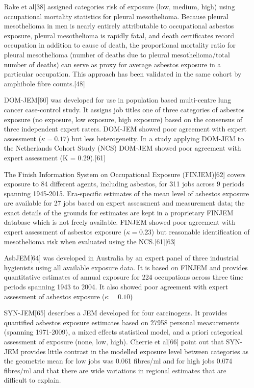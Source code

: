 \documentclass[12pt,a4paper,]{report}
\begin{document}
Rake et al{[}38{]} assigned categories risk of exposure (low, medium,
high) using occupational mortality statistics for pleural mesothelioma.
Because pleural mesothelioma in men is nearly entirely attributable to
occupational asbestos exposure, pleural mesothelioma is rapidly fatal,
and death certificates record occupation in addition to cause of death,
the proportional mortality ratio for pleural mesothelioma (number of
deaths due to pleural mesothelioma/total number of deaths) can serve as
proxy for average asbestos exposure in a particular occupation. This
approach has been validated in the same cohort by amphibole fibre
counts.{[}48{]}

DOM-JEM{[}60{]} was developed for use in population based multi-centre
lung cancer case-control study. It assigns job titles one of three
categories of asbestos exposure (no exposure, low exposure, high
exposure) based on the consensus of three independent expert raters.
DOM-JEM showed poor agreement with expert assessment
(\ensuremath{\kappa = 0.17}) but less heterogeneity. In a study applying
DOM-JEM to the Netherlands Cohort Study (NCS) DOM-JEM showed poor
agreement with expert assessment (K = 0.29).{[}61{]}

The Finish Information System on Occupational Exposure (FINJEM){[}62{]}
covers exposure to 84 different agents, including asbestos, for 311 jobs
across 9 periods spanning 1945-2015. Era-specific estimates of the mean
level of asbestos exposure are available for 27 jobs based on expert
assessment and measurement data; the exact details of the grounds for
estimates are kept in a proprietary FINJEM database which is not freely
available. FINJEM showed poor agreement with expert assessment of
asbestos exposure (\ensuremath{\kappa = 0.23}) but reasonable
identification of mesothelioma risk when evaluated using the
NCS.{[}61{]}{[}63{]}

AsbJEM{[}64{]} was developed in Australia by an expert panel of three
industrial hygienists using all available exposure data. It is based on
FINJEM and provides quantitative estimates of annual exposure for 224
occupations across three time periods spanning 1943 to 2004. It also
showed poor agreement with expert assessment of asbestos exposure
(\ensuremath{\kappa = 0.10})

SYN-JEM{[}65{]} describes a JEM developed for four carcinogens. It
provides quantified asbestos exposure estimates based on 27958 personal
measurements (spanning 1971-2009), a mixed effects statistical model,
and a priori categorical assessment of exposure (none, low, high).
Cherrie et al{[}66{]} point out that SYN-JEM provides little contrast in
the modelled exposure level between categories as the geometric mean for
low jobs was 0.061 fibres/ml and for high jobs 0.074 fibres/ml and that
there are wide variations in regional estimates that are difficult to
explain.
\end{document}
